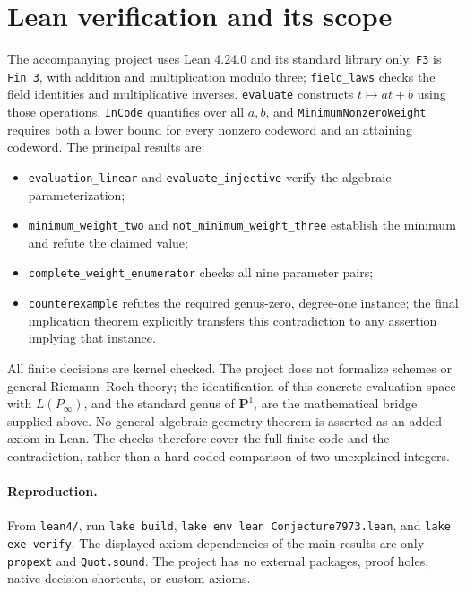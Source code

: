 \documentclass[11pt,a4paper]{article}
\begin{document}
\section{Lean verification and its scope}
The accompanying project uses Lean 4.24.0 and its standard library only.
\texttt{F3} is \texttt{Fin 3}, with addition and multiplication modulo three;
\texttt{field\_laws} checks the field identities and multiplicative inverses.
\texttt{evaluate} constructs $t\mapsto at+b$ using those operations.
\texttt{InCode} quantifies over all $a,b$, and
\texttt{MinimumNonzeroWeight} requires both a lower bound for every
nonzero codeword and an attaining codeword. The principal results are:
\begin{itemize}
\item \texttt{evaluation\_linear} and \texttt{evaluate\_injective} verify
the algebraic parameterization;
\item \texttt{minimum\_weight\_two} and
\texttt{not\_minimum\_weight\_three} establish the minimum and refute
the claimed value;
\item \texttt{complete\_weight\_enumerator} checks all nine parameter pairs;
\item \texttt{counterexample} refutes the required genus-zero,
degree-one instance; the final implication theorem explicitly transfers
this contradiction to any assertion implying that instance.
\end{itemize}
All finite decisions are kernel checked. The project does not formalize
schemes or general Riemann--Roch theory; the identification of this concrete
evaluation space with $L(P_\infty)$, and the standard genus of $\mathbf P^1$,
are the mathematical bridge supplied above. No general algebraic-geometry
theorem is asserted as an added axiom in Lean. The checks therefore cover
the full finite code and the contradiction, rather than a hard-coded
comparison of two unexplained integers.

\paragraph{Reproduction.}
From \texttt{lean4/}, run \texttt{lake build},
\texttt{lake env lean Conjecture7973.lean}, and \texttt{lake exe verify}.
The displayed axiom dependencies of the main results are only
\texttt{propext} and \texttt{Quot.sound}. The project has no external packages,
proof holes, native decision shortcuts, or custom axioms.
\end{document}
